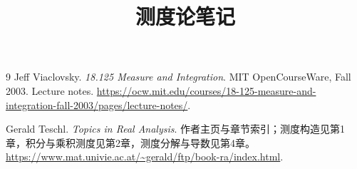 \documentclass[UTF8,12pt,a4paper,fontset=fandol]{ctexbook}
\title{测度论笔记}
\author{}
\date{}
\begin{document}
\frontmatter %

\maketitle
\tableofcontents

\mainmatter














\appendix

\begin{thebibliography}{9}
Jeff Viaclovsky.
\textit{18.125 Measure and Integration}.
MIT OpenCourseWare, Fall 2003. Lecture notes.
\url{https://ocw.mit.edu/courses/18-125-measure-and-integration-fall-2003/pages/lecture-notes/}.

Gerald Teschl.
\textit{Topics in Real Analysis}.
作者主页与章节索引；测度构造见第1章，积分与乘积测度见第2章，测度分解与导数见第4章。
\url{https://www.mat.univie.ac.at/~gerald/ftp/book-ra/index.html}.
\end{thebibliography}
\end{document}
